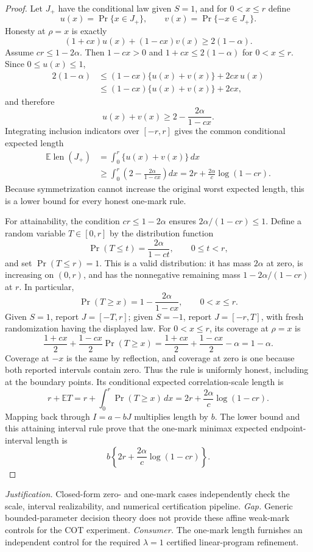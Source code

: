 \documentclass{article}
\begin{document}
\begin{proof}
Let \(J_+\) have the conditional law given \(S=1\), and for \(0<x\leq r\) define
\[
 u(x)=\Pr\{x\in J_+\},\qquad v(x)=\Pr\{-x\in J_+\}.
\]
Honesty at \(\rho=x\) is exactly
\[
 (1+cx)u(x)+(1-cx)v(x)\geq 2(1-\alpha).
\]
Assume \(cr\leq1-2\alpha\).  Then \(1-cx>0\) and \(1+cx\leq2(1-\alpha)\) for \(0<x\leq r\).  Since \(0\leq u(x)\leq1\),
\[
 \begin{aligned}
 2(1-\alpha)
 &\leq (1-cx)\{u(x)+v(x)\}+2cx\,u(x)\\
 &\leq (1-cx)\{u(x)+v(x)\}+2cx,
 \end{aligned}
\]
and therefore
\[
 u(x)+v(x)\geq 2-\frac{2\alpha}{1-cx}.
\]
Integrating inclusion indicators over \([-r,r]\) gives the common conditional expected length
\[
 \begin{aligned}
 \mathbb E\operatorname{len}(J_+)
 &=\int_0^r\{u(x)+v(x)\}\,dx\\
 &\geq\int_0^r\left(2-\frac{2\alpha}{1-cx}\right)dx
 =2r+\frac{2\alpha}{c}\log(1-cr).
 \end{aligned}
\]
Because symmetrization cannot increase the original worst expected length, this is a lower bound for every honest one-mark rule.

For attainability, the condition \(cr\leq1-2\alpha\) ensures \(2\alpha/(1-cr)\leq1\).  Define a random variable \(T\in[0,r]\) by the distribution function
\[
 \Pr(T\leq t)=\frac{2\alpha}{1-ct},\qquad 0\leq t<r,
\]
and set \(\Pr(T\leq r)=1\).  This is a valid distribution: it has mass \(2\alpha\) at zero, is increasing on \((0,r)\), and has the nonnegative remaining mass \(1-2\alpha/(1-cr)\) at \(r\).  In particular,
\[
 \Pr(T\geq x)=1-\frac{2\alpha}{1-cx},\qquad 0<x\leq r.
\]
Given \(S=1\), report \(J=[-T,r]\); given \(S=-1\), report \(J=[-r,T]\), with fresh randomization having the displayed law.  For \(0<x\leq r\), its coverage at \(\rho=x\) is
\[
 \frac{1+cx}{2}+\frac{1-cx}{2}\Pr(T\geq x)
 =\frac{1+cx}{2}+\frac{1-cx}{2}-\alpha
 =1-\alpha.
\]
Coverage at \(-x\) is the same by reflection, and coverage at zero is one because both reported intervals contain zero.  Thus the rule is uniformly honest, including at the boundary points.  Its conditional expected correlation-scale length is
\[
 r+\mathbb ET
 =r+\int_0^r\Pr(T\geq x)\,dx
 =2r+\frac{2\alpha}{c}\log(1-cr).
\]
Mapping back through \(I=a-bJ\) multiplies length by \(b\).  The lower bound and this attaining interval rule prove that the one-mark minimax expected endpoint-interval length is
\[
 b\left\{2r+\frac{2\alpha}{c}\log(1-cr)\right\}.
\]
\end{proof}
\par\smallskip\noindent \textit{Justification.} Closed-form zero- and one-mark cases independently check the scale, interval realizability, and numerical certification pipeline. \textit{Gap.} Generic bounded-parameter decision theory does not provide these affine weak-mark controls for the COT experiment. \textit{Consumer.} The one-mark length furnishes an independent control for the required \(\lambda=1\) certified linear-program refinement.
\end{document}
